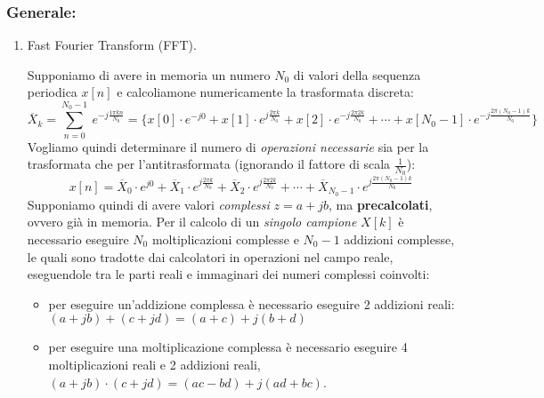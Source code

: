 \documentclass[
]{article}
\providecommand{\tightlist}{%
  \setlength{\itemsep}{0pt}\setlength{\parskip}{0pt}}
\begin{document}
\subsubsection{Generale:}\label{generale}

\begin{enumerate}
\def\labelenumi{\arabic{enumi}.}
\setcounter{enumi}{24}
\item
  Fast Fourier Transform (FFT).

  Supponiamo di avere in memoria un numero \(N_0\) di valori della
  sequenza periodica \(x[n]\) e calcoliamone numericamente la
  trasformata discreta: \[
  \overline{X}_k = \sum_{n=0}^{N_0 -1} \  e^{-j\frac{1\pi kn}{N_0}} =\Big\{ x[0]\cdot e^{-j0}+x[1]\cdot e^{j\frac{2\pi k}{N_0}}+x[2]\cdot e^{-j\frac{2\pi 2k}{N_0}} + \cdots + x[N_0 -1]\cdot e^{-j\frac{2\pi(N_0 -1)k}{N_0}}\Big\}
  \] Vogliamo quindi determinare il numero di \emph{operazioni
  necessarie} sia per la trasformata che per l'antitrasformata
  (ignorando il fattore di scala \(\frac{1}{N_0}\)): \[
  x[n] = \overline{X}_0 \cdot e^{j0}+\overline{X}_1\cdot e^{j\frac{2\pi k}{N_0}}+\overline{X}_2\cdot e^{j\frac{2\pi 2k}{N_0}} + \cdots + \overline{X}_{N_0 -1}\cdot e^{j\frac{2\pi(N_0 -1)k}{N_0}}
  \] Supponiamo quindi di avere valori \emph{complessi} \(z=a+jb\), ma
  \textbf{precalcolati}, ovvero già in memoria. Per il calcolo di un
  \emph{singolo campione} \(X[k]\) è necessario eseguire \(N_0\)
  moltiplicazioni complesse e \(N_0 -1\) addizioni complesse, le quali
  sono tradotte dai calcolatori in operazioni nel campo reale,
  eseguendole tra le parti reali e immaginari dei numeri complessi
  coinvolti:

  \begin{itemize}
  \tightlist
  \item
    per eseguire un'addizione complessa è necessario eseguire 2
    addizioni reali: \((a + jb) + (c + jd) = (a + c) + j(b + d)\)
  \item
    per eseguire una moltiplicazione complessa è necessario eseguire 4
    moltiplicazioni reali e 2 addizioni reali,
    \((a + jb) · (c + jd) = (ac - bd) + j(ad + bc)\).
  \end{itemize}


\end{enumerate}
\end{document}
